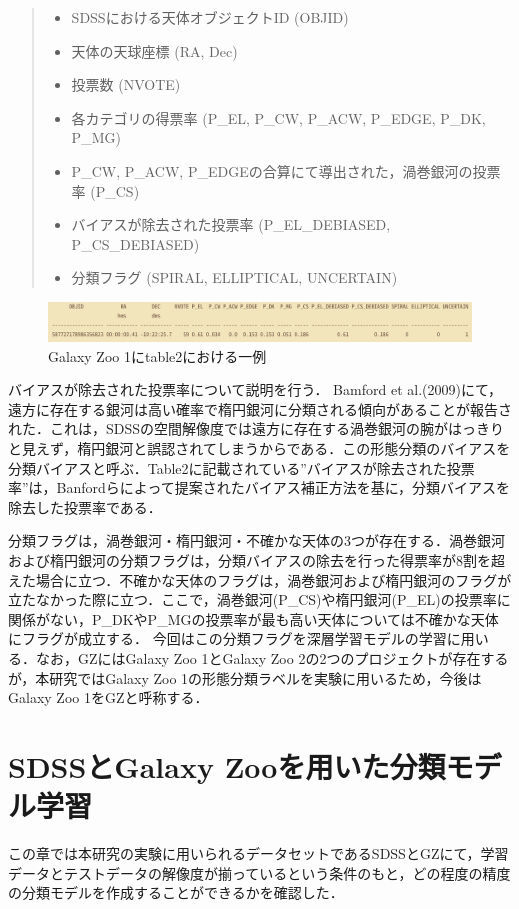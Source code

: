 \documentclass[a4j, 11pt]{jreport}
\begin{document}
\begin{quote}
  \begin{itemize}
   \item SDSSにおける天体オブジェクトID (OBJID)
   \item 天体の天球座標 (RA, Dec)
   \item 投票数 (NVOTE)
   \item 各カテゴリの得票率 (P\_EL, P\_CW, P\_ACW, P\_EDGE, P\_DK, P\_MG)
   \item P\_CW, P\_ACW, P\_EDGEの合算にて導出された，渦巻銀河の投票率 (P\_CS)
   \item バイアスが除去された投票率 (P\_EL\_DEBIASED, P\_CS\_DEBIASED)
   \item 分類フラグ (SPIRAL, ELLIPTICAL, UNCERTAIN)
  \end{itemize}
\end{quote}

\begin{figure}[H]
  \centering
  \includegraphics[width=1\hsize,keepaspectratio]{images/table2.png}
  \caption{Galaxy Zoo 1にtable2における一例}
  \label{fig:table2}
\end{figure}
 

バイアスが除去された投票率について説明を行う．
Bamford et al.(2009)\cite{Bamford2009}にて，遠方に存在する銀河は高い確率で楕円銀河に分類される傾向があることが報告された．これは，SDSSの空間解像度では遠方に存在する渦巻銀河の腕がはっきりと見えず，楕円銀河と誤認されてしまうからである．この形態分類のバイアスを分類バイアスと呼ぶ．Table2に記載されている''バイアスが除去された投票率''は，Banfordらによって提案されたバイアス補正方法を基に，分類バイアスを除去した投票率である．

分類フラグは，渦巻銀河・楕円銀河・不確かな天体の3つが存在する．渦巻銀河および楕円銀河の分類フラグは，分類バイアスの除去を行った得票率が8割を超えた場合に立つ．不確かな天体のフラグは，渦巻銀河および楕円銀河のフラグが立たなかった際に立つ．ここで，渦巻銀河(P\_CS)や楕円銀河(P\_EL)の投票率に関係がない，P\_DKやP\_MGの投票率が最も高い天体については不確かな天体にフラグが成立する．
今回はこの分類フラグを深層学習モデルの学習に用いる．なお，GZにはGalaxy Zoo 1とGalaxy Zoo 2の2つのプロジェクトが存在するが，本研究ではGalaxy Zoo 1の形態分類ラベルを実験に用いるため，今後はGalaxy Zoo 1をGZと呼称する．


\newpage
\chapter{SDSSとGalaxy Zooを用いた分類モデル学習}
この章では本研究の実験に用いられるデータセットであるSDSSとGZにて，学習データとテストデータの解像度が揃っているという条件のもと，どの程度の精度の分類モデルを作成することができるかを確認した．
\end{document}
